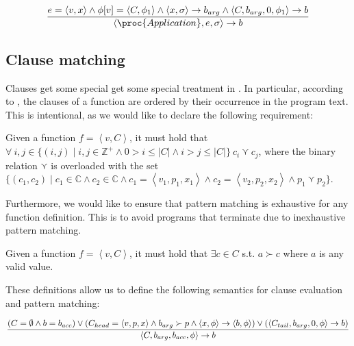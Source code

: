 \begin{equation}
{\displaystyle
  e = \left\langle v, x\right\rangle
\wedge
  \phi[v]=\left\langle C,\phi_1 \right\rangle
\wedge
  \left\langle x,\sigma\right\rangle
  \rightarrow
  b_{arg}
\wedge
  \left\langle C,b_{arg},0,\phi_1\right\rangle
  \rightarrow
  b
\over\displaystyle
  \left\langle \proc{Application}, e,\sigma\right\rangle
  \rightarrow
  b
}
\end{equation}

\subsection{Clause matching}

Clauses get some special get some special treatment in \D{}. In particular,
according to , the clauses of a function are
ordered by their occurrence in the program text. This is intentional, as we
would like to declare the following requirement:

\begin{definition} Given a function $f= \left\langle v, C \right\rangle$, it
must hold that $\forall\ i,j\in\{(i,j)\mid i,j\in\mathbb{Z}^+ \wedge 0 > i \leq
|C| \wedge i > j \leq |C|\}\ c_i \curlyvee c_j$, where the binary relation
$\curlyvee$ is overloaded with the set $\{(c_1,c_2)\mid c_1\in\mathbb{C} \wedge
c_2\in\mathbb{C} \wedge c_1= \left\langle v_1,p_1,x_1 \right\rangle \wedge c_2=
\left\langle v_2,p_2,x_2 \right\rangle \wedge p_1\curlyvee
p_2\}$.\end{definition}

Furthermore, we would like to ensure that pattern matching is exhaustive for
any function definition. This is to avoid programs that terminate due to
inexhaustive pattern matching.

\begin{definition} Given a function $f=\left\langle v, C\right\rangle$, it must
hold that $\exists c\in C$ s.t. $a\succ c$ where $a$ is any valid \D{}
value.\end{definition}

These definitions allow us to define the following semantics for clause
evaluation and pattern matching:

\begin{equation}
{\displaystyle
  \left(
      C=\emptyset
    \wedge
      b=b_{acc}
  \right)
  \vee
  \left(
      C_{head}=\left\langle v,p,x\right\rangle
    \wedge
      b_{arg}\succ p
    \wedge
      \left\langle x,\phi\right\rangle
      \rightarrow
      \left\langle b,\phi\right\rangle
  \right)
  \vee
  \left(
      \left\langle C_{tail},b_{arg},0,\phi\right\rangle
      \rightarrow
      b
  \right)
\over\displaystyle
  \left\langle C,b_{arg},b_{acc},\phi\right\rangle
  \rightarrow
  b
}
\end{equation}
